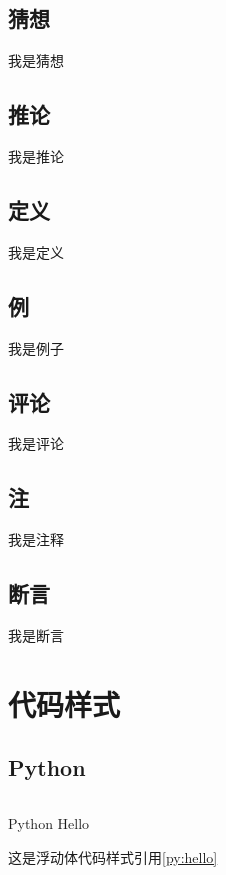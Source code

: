 \subsection{猜想}
    \begin{conj}
        我是猜想
    \end{conj}
\subsection{推论}
    \begin{infer}
        我是推论
    \end{infer}
\subsection{定义}
    \begin{defi}
        我是定义
    \end{defi}
\subsection{例}
    \begin{exmp}
        我是例子
    \end{exmp}
\subsection{评论}
    \begin{remark}
        我是评论
    \end{remark}
\subsection{注}
    \begin{note}
        我是注释
    \end{note}
\subsection{断言}
    \begin{asset}
        我是断言
    \end{asset}
\clearpage
\section[代码样式]{代码样式}
\subsection{Python}

\begin{listing}[H]
    \inputminted[linenos=true]{python}{code/example.py}
    \caption{Python Hello}
    \label{py:hello}
\end{listing}
\noindent 这是浮动体代码样式引用\ref{py:hello}

